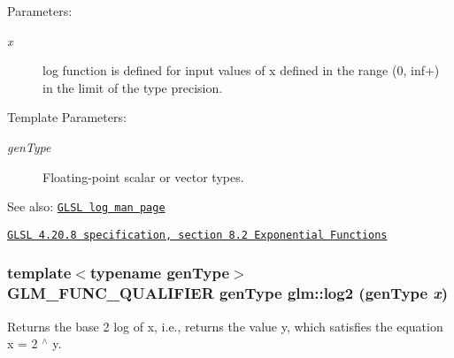\begin{Desc}
\item[Parameters:]
\begin{description}
\item[{\em x}]log function is defined for input values of x defined in the range (0, inf+) in the limit of the type precision. \end{description}
\end{Desc}
\begin{Desc}
\item[Template Parameters:]
\begin{description}
\item[{\em genType}]Floating-point scalar or vector types.\end{description}
\end{Desc}
\begin{Desc}
\item[See also:]\href{http://www.opengl.org/sdk/docs/manglsl/xhtml/log.xml}{\tt GLSL log man page} 

\href{http://www.opengl.org/registry/doc/GLSLangSpec.4.20.8.pdf}{\tt GLSL 4.20.8 specification, section 8.2 Exponential Functions} \end{Desc}
\hypertarget{group__core__func__exponential_g501534b7328bab23128aa15b316e483d}{
\subsubsection[log2]{\setlength{\rightskip}{0pt plus 5cm}template$<$typename genType$>$ GLM\_\-FUNC\_\-QUALIFIER genType glm::log2 (genType {\em x})}}
\label{group__core__func__exponential_g501534b7328bab23128aa15b316e483d}


Returns the base 2 log of x, i.e., returns the value y, which satisfies the equation x = 2 $^\wedge$ y.

